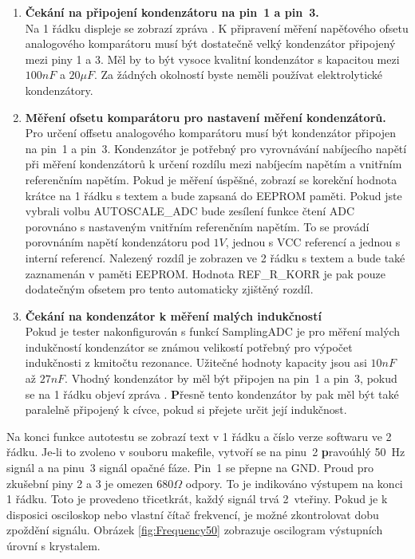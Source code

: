 \begin{enumerate}
\item {\textbf {Čekání na připojení kondenzátoru na pin~1 a pin~3.}}
\\Na 1 řádku displeje se zobrazí zpráva .
K připravení měření napěťového ofsetu analogového komparátoru musí být dostatečně velký
kondenzátor připojený mezi piny 1 a 3.
Měl by to být vysoce kvalitní kondenzátor s kapacitou mezi \(100nF\) a \(20\mu F\). 
Za žádných okolností byste neměli používat elektrolytické kondenzátory.


\item \textbf {Měření ofsetu komparátoru pro nastavení měření kondenzátorů.}
\\Pro určení offsetu analogového komparátoru musí být kondenzátor připojen na pin~1 a pin~3.
Kondenzátor je potřebný pro vyrovnávání nabíjecího napětí při měření kondenzátorů k určení rozdílu mezi
nabíjecím napětím a vnitřním referenčním napětím.
Pokud je měření úspěšné, zobrazí se korekční hodnota krátce  na 1 řádku s textem  a bude zapsaná do EEPROM paměti.
Pokud jste vybrali volbu AUTOSCALE\_ADC bude zesílení funkce čtení ADC porovnáno s nastaveným vnitřním referenčním napětím.
To se provádí porovnáním napětí kondenzátoru pod \(1V\),  jednou s VCC referencí a jednou s interní referencí.
Nalezený rozdíl je zobrazen ve 2 řádku s textem  a bude také zaznamenán v paměti EEPROM.
Hodnota REF\_R\_KORR je pak pouze dodatečným ofsetem pro tento automaticky zjištěný rozdíl.

\item {\textbf {Čekání na kondenzátor k měření malých indukčností}}
\\Pokud je tester nakonfigurován s funkcí SamplingADC je pro měření malých indukčností
kondenzátor se známou velikostí potřebný pro výpočet indukčnosti z kmitočtu rezonance.
Užitečné hodnoty kapacity jsou asi \(10nF\) až \(27nF\).
Vhodný kondenzátor by měl být připojen na pin~1 a pin~3, pokud se na 1 řádku objeví zpráva .
{\textbf Přesně tento kondenzátor} by pak měl být také paralelně připojený k cívce, pokud si přejete určit její indukčnost.

\end{enumerate}

Na konci funkce autotestu se zobrazí text  v 1 řádku a číslo verze softwaru ve 2 řádku.
Je-li to zvoleno v souboru makefile, vytvoří se na pinu~2 {\textbf pravoúhlý 50~Hz signál} a na pinu~3 signál opačné fáze.
Pin~1 se přepne na GND.
Proud pro zkušební piny 2 a 3 je omezen \(680\Omega\) odpory.
To je indikováno výstupem  na konci 1 řádku.
Toto je provedeno třicetkrát, každý signál trvá 2~vteřiny.
Pokud je k disposici osciloskop nebo vlastní čítač frekvencí, je možné zkontrolovat dobu zpoždění signálu.
Obrázek \ref{fig:Frequency50} zobrazuje oscilogram výstupních úrovní s krystalem.

